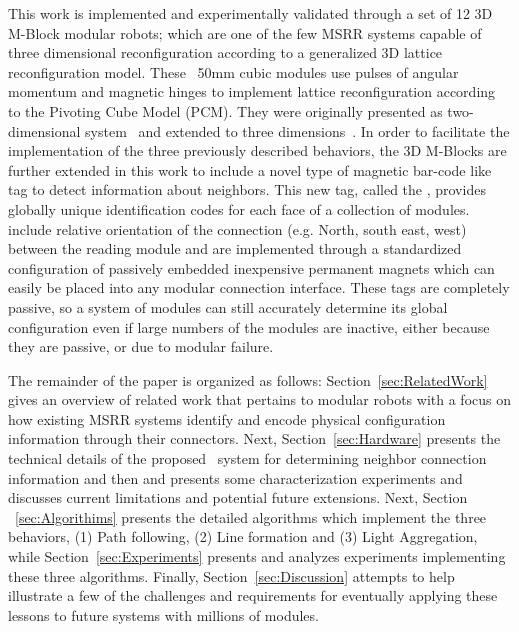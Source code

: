 This work is implemented and experimentally validated through a set of 12 3D M-Block modular robots; which are one of the few MSRR systems capable of three dimensional reconfiguration according to a generalized 3D lattice reconfiguration model. These ~50mm cubic modules use pulses of angular momentum and magnetic hinges to implement lattice reconfiguration according to the Pivoting Cube Model (PCM). They were originally presented as two-dimensional system~\cite{RomanishinRus-IROS13} and extended to three dimensions~\cite{Romanishin20153d}. In order to facilitate the implementation of the three previously described behaviors, the 3D M-Blocks are further extended in this work to include a novel type of magnetic bar-code like tag to detect information about neighbors. This new tag, called the \tagNamePlural, provides globally unique identification codes for each face of a collection of modules. \TagNamePlural include relative orientation of the connection (e.g. North, south east, west) between the reading module and are implemented through a standardized configuration of passively embedded inexpensive permanent magnets which can easily be placed into any modular connection interface. These tags are completely passive, so a system of modules can still accurately determine its global configuration even if large numbers of the modules are inactive, either because they are passive, or due to modular failure.

The remainder of the paper is organized as follows: Section~\ref{sec:RelatedWork} gives an overview of related work that pertains to modular robots with a focus on how existing MSRR systems identify and encode physical configuration information through their connectors. Next, Section~\ref{sec:Hardware} presents the technical details of the proposed \tagNamePlural~system for determining neighbor connection information and then and presents some characterization experiments and discusses current limitations and potential future extensions. Next, Section ~\ref{sec:Algorithims} presents the detailed algorithms which implement the three behaviors, (1) Path following, (2) Line formation and (3) Light Aggregation, while Section~\ref{sec:Experiments} presents and analyzes experiments implementing these three algorithms. Finally, Section~\ref{sec:Discussion} attempts to help illustrate a few of the challenges and requirements for eventually applying these lessons to future systems with millions of modules.


%
%	
%
%
%
%
%
%
